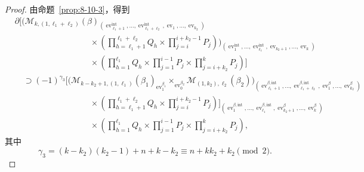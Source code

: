 \begin{proof}
由命题~\ref{prop:8-10-3}，得到
\begingroup
\small
\[
\begin{aligned}
&\partial\Bigg[
\Bigg(
\mathcal M_{k,(1,\ell_1+\ell_2)}(\beta)_
{(\operatorname{ev}_{\ell_1+1}^{\mathrm{int}},\ldots,
\operatorname{ev}_{\ell_1+\ell_2}^{\mathrm{int}},
\operatorname{ev}_1,\ldots,\operatorname{ev}_{k_2})}\\[-2pt]
&\hspace{9em}{}\times
\left(\prod_{h=\ell_1+1}^{\ell_1+\ell_2}Q_h
\times\prod_{j=i}^{i+k_2-1}P_j\right)
\Bigg)_
{(\operatorname{ev}_1^{\mathrm{int}},\ldots,
\operatorname{ev}_{\ell_1}^{\mathrm{int}},
\operatorname{ev}_{k_2+1},\ldots,\operatorname{ev}_k)}\\[-2pt]
&\hspace{9em}{}\times
\left(\prod_{h=1}^{\ell_1}Q_h
\times\prod_{j=1}^{i-1}P_j
\times\prod_{j=i+k_2}^{k}P_j\right)\Bigg]\\
&\quad\supset(-1)^{\gamma_3}
\Bigg[
\Bigg(
\mathcal M_{k-k_2+1,(1,\ell_1)}(\beta_1)_
{\operatorname{ev}_1^{\beta_1}}
\mathop{\times}_{\operatorname{ev}_0^{\beta_2}}
\mathcal M_{(1,k_2),\ell_2}(\beta_2)
\Bigg)_
{(\operatorname{ev}_{\ell_1+1}^{\beta,\mathrm{int}},\ldots,
\operatorname{ev}_{\ell_1+\ell_2}^{\beta,\mathrm{int}},
\operatorname{ev}_1^\beta,\ldots,\operatorname{ev}_{k_2}^\beta)}\\[-2pt]
&\hspace{9em}{}\times
\left(\prod_{h=\ell_1+1}^{\ell_1+\ell_2}Q_h
\times\prod_{j=i}^{i+k_2-1}P_j\right)
\Bigg]_
{(\operatorname{ev}_1^{\beta,\mathrm{int}},\ldots,
\operatorname{ev}_{\ell_1}^{\beta,\mathrm{int}},
\operatorname{ev}_{k_2+1}^\beta,\ldots,\operatorname{ev}_k^\beta)}\\[-2pt]
&\hspace{9em}{}\times
\left(\prod_{h=1}^{\ell_1}Q_h
\times\prod_{j=1}^{i-1}P_j
\times\prod_{j=i+k_2}^{k}P_j\right),
\end{aligned}
\]
\endgroup
其中
\[
 \gamma_3=(k-k_2)(k_2-1)+n+k-k_2
 \equiv n+kk_2+k_2\pmod2.
\]


\end{proof}

